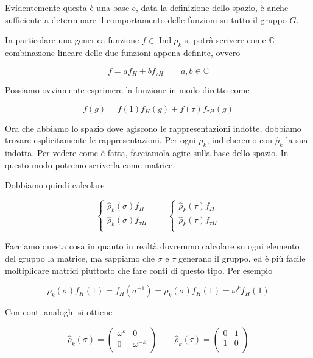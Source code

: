 \documentclass[11pt]{article}
\theoremstyle{plain}
\theoremstyle{definition}
\theoremstyle{remark}
\newcommand{\C}{\mathbb{C}}
\DeclareMathOperator{\Ind}{Ind}
\begin{document}
Evidentemente questa è una base e, data la definizione dello spazio, è anche sufficiente a determinare il comportamento delle funzioni su tutto il gruppo $G$.

In particolare una generica funzione $f \in \Ind \rho_k$ si potrà scrivere come $\C$ combinazione lineare delle due funzioni appena definite, ovvero

\[ f = a f_H + b f_{\tau H} \qquad a,b \in \C\]


Possiamo ovviamente esprimere la funzione in modo diretto come

\[ f(g) = f(1) f_H(g) + f(\tau) f_{\tau H} (g) \]

Ora che abbiamo lo spazio dove agiscono le rappresentazioni indotte, dobbiamo trovare esplicitamente le rappresentazioni. Per ogni $\rho_k$, indicheremo con $\hat \rho_k$ la sua indotta. Per vedere come è fatta, facciamola agire sulla base dello spazio. In questo modo potremo scriverla come matrice.

Dobbiamo quindi calcolare

\[
\begin{cases}
\hat \rho_k (\sigma) f_H \\
\hat \rho_k (\sigma) f_{\tau H} \\
\end{cases}
\qquad
\begin{cases}
\hat \rho_k (\tau) f_H \\
\hat \rho_k (\tau) f_{\tau H}\\
\end{cases}
\]

Facciamo questa cosa in quanto in realtà dovremmo calcolare su ogni elemento del gruppo la matrice, ma sappiamo che $\sigma$ e $\tau$ generano il gruppo, ed è più facile moltiplicare matrici piuttosto che fare conti di questo tipo.  Per esempio


\[
\hat \rho_k (\sigma) f_H(1) = f_H(\sigma^{-1}) = \rho_k(\sigma) f_H(1) = \omega^k f_H(1)
\]

Con conti analoghi si ottiene


\[
\hat \rho_k (\sigma) =
\left(
\begin{array}{cc}
\omega^k & 0 \\
0 & \omega^{-k} \\
\end{array}
\right)
\qquad
\hat \rho_k (\tau) =
\left(
\begin{array}{cc}
0 & 1 \\
1 & 0 \\
\end{array}
\right)
\]
\end{document}

